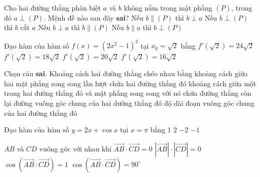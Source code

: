\begin{ex}%
	Cho hai đường thẳng phân biệt $a$ và $b$ không nằm trong mặt phẳng $(P)$, trong đó $a \perp (P)$. Mệnh đề nào sau đây {\bf sai}? 
	\choice
	{Nếu $b \parallel (P)$ thì $b \perp a$}
	{\True Nếu $b\perp (P)$ thì $b$ cắt $a$}
	{ Nếu $b \perp a$ thì $b \parallel (P)$}
	{Nếu $b \parallel a$ thì $b \perp (P)$}
\end{ex}
\begin{ex}%
	Đạo hàm của hàm số $f(x)=(2x^2-1)^2$ tại $x_0=\sqrt{2}$ bằng
	\choice
	{\True $f'(\sqrt{2})=24\sqrt{2}$}
	{ $f'(\sqrt{2})=18\sqrt{2} $}
	{ $f'(\sqrt{2})=20\sqrt{2} $}
	{ $f'(\sqrt{2})=16\sqrt{2} $}
\end{ex}
\begin{ex}%
	Chọn câu {\bf sai}. Khoảng cách hai đường thẳng chéo nhau bằng
	\choice
	{khoảng cách giữa hai mặt phẳng song song lần lượt chứa hai đường thẳng đó}
	{ khoảng cách giữa một trong hai đường thẳng đó và mặt phẳng song song với nó chứa đường thẳng còn lại}
	{\True đường vuông góc chung của hai dường thẳng đó}
	{độ dài đoạn vuông góc chung của hai đường thẳng đó}
	\loigiai{
		
	} 
\end{ex}
\begin{ex}%
	Đạo hàm của hàm số $y=2x+\cos x$ tại $x=\pi$ bằng
	\choice
	{$1$}
	{\True $2$}
	{ $-2$}
	{$-1$}
\end{ex}
\begin{ex}%
	 $ AB $ và $ CD $ vuông góc với nhau khi
	\choice
	{\True $\overrightarrow{AB}\cdot\overrightarrow{CD} = 0$}
	{$|\overrightarrow{AB}|\cdot|\overrightarrow{CD} |= 0$}
	{$\cos (\overrightarrow{AB}\cdot\overrightarrow{CD}) = 1$}
	{$\cos(\overrightarrow{AB}\cdot\overrightarrow{CD}) = 90^\circ $}
\end{ex}
